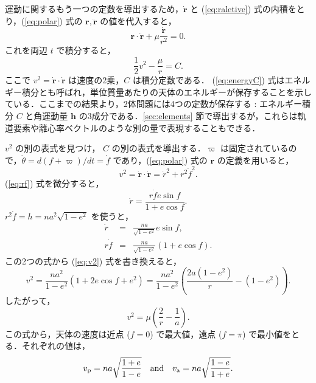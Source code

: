 \documentclass[11pt,a4paper,oneside,onecolumn]{jarticle}
\begin{document}
運動に関するもう一つの定数を導出するため，$\dot{{\bm r}}$ と (\ref{eq:raletive}) 式の内積をとり，(\ref{eq:polar}) 式の ${\bm r}, \ddot{{\bm r}}$ の値を代入すると，
\begin{equation}
{\bm r} \cdot \ddot{{\bm r}} + \mu \frac{\dot{{\bm r}}}{r^2} = 0.
\end{equation}
これを両辺 $t$ で積分すると，
\begin{equation}
\frac{1}{2} v^2 - \frac{\mu}{r} = C. \label{eq:energyC}
\end{equation}
ここで $v^2 = \dot{{\bm r}} \cdot \dot{{\bm r}}$ は速度の2乗，$C$ は積分定数である．
(\ref{eq:energyC}) 式はエネルギー積分とも呼ばれ，単位質量あたりの天体のエネルギーが保存することを示している．ここまでの結果より，2体問題には4つの定数が保存する : エネルギー積分 $C$ と角運動量 ${\bm h}$ の3成分である．\ref{sec:elements} 節で導出するが，これらは軌道要素や離心率ベクトルのような別の量で表現することもできる．

$v^2$ の別の表式を見つけ， $C$ の別の表式を導出する．$\varpi$ は固定されているので，$\dot{\theta} = d (f + \varpi) / dt = \dot{f}$ であり，(\ref{eq:polar}) 式の ${\bm r}$ の定義を用いると，
\begin{equation}
v^2 = \dot{{\bm r}} \cdot \dot{{\bm r}} = \dot{r}^2 + r^2 \dot{f}^2. \label{eq:v2}
\end{equation}
(\ref{eq:rf}) 式を微分すると，
\begin{equation}
\dot{r} = \frac{r \dot{f} e \sin f}{1+ e \cos f}.
\end{equation}
$r^2 \dot{f} = h = n a^2 \sqrt{1 - e^2}$ を使うと，
\begin{eqnarray}
\dot{r} & = & \frac{n a}{\sqrt{1 - e^2}} e \sin f, \label{eq:rdot} \\
r \dot{f} & = & \frac{n a}{\sqrt{1 - e^2}} (1+ e \cos f). \label{eq:rfdot}
\end{eqnarray}
この2つの式から (\ref{eq:v2}) 式を書き換えると，
\begin{equation}
v^2 = \frac{n a^2}{1 - e^2} (1 + 2 e \cos f + e^2) = \frac{n a^2}{1 - e^2} \left( \frac{2 a (1 - e^2)}{r} - (1 - e^2) \right).
\end{equation}
したがって，
\begin{equation}
v^2 = \mu \left( \frac{2}{r} - \frac{1}{a} \right). \label{eq:v2new}
\end{equation}
この式から，天体の速度は近点 ($f = 0$) で最大値，遠点 ($f = \pi$) で最小値をとる．それぞれの値は，
\begin{equation}
v_{\rm p} = n a \sqrt{\frac{1 + e}{1 - e}} \quad {\rm and} \quad v_{\rm a} = n a \sqrt{\frac{1 - e}{1 + e}}.
\end{equation}
\end{document}
